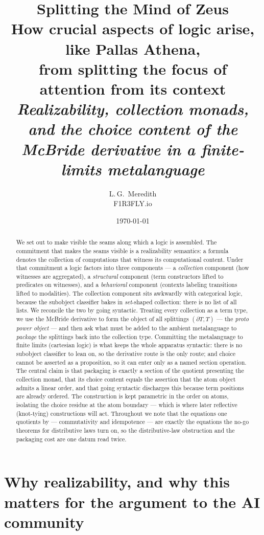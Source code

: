\documentclass[11pt]{article}
\title{\bfseries Splitting the Mind of Zeus\\[4pt]
\large How crucial aspects of logic arise, like Pallas Athena,\\
from splitting the focus of attention from its context\\[6pt]
\normalsize\normalfont\itshape Realizability, collection monads, and the choice
content of the McBride derivative in a finite-limits metalanguage}
\author{L.\,G.\ Meredith\\\small F1R3FLY.io}
\date{\today}
\theoremstyle{definition}
\theoremstyle{plain}
\newcommand{\p}{\partial}
\newcommand{\T}{T}
\begin{document}
\maketitle

\begin{abstract}
\noindent
We set out to make visible the seams along which a logic is assembled. The
commitment that makes the seams visible is a realizability semantics:
a formula denotes the collection of computations that witness its
computational content. Under that commitment a logic factors into three
components --- a \emph{collection} component (how witnesses are aggregated),
a \emph{structural} component (term constructors lifted to predicates on
witnesses), and a \emph{behavioral} component (contexts labeling
transitions lifted to modalities). The collection component sits awkwardly
with categorical logic, because the subobject classifier bakes in
\emph{set}-shaped collection: there is no list of all lists. We reconcile the
two by going syntactic. Treating every collection as a term type, we use the
McBride derivative to form the object of all splittings $(\p\T,\T)$ --- the
\emph{proto power object} --- and then ask what must be added to the ambient
metalanguage to \emph{package} the splittings back into the collection type.
Committing the metalanguage to finite limits (cartesian logic) is what keeps
the whole apparatus syntactic: there is no subobject classifier to lean on,
so the derivative route is the only route; and choice cannot be asserted as a
proposition, so it can enter only as a named section operation. The central
claim is that packaging is exactly a section of the quotient presenting the
collection monad, that its choice content equals the assertion that the atom
object admits a linear order, and that going syntactic discharges this because
term positions are already ordered. The construction is kept parametric in the
order on atoms, isolating the choice residue at the atom boundary --- which is
where later reflective (knot-tying) constructions will act. Throughout we note
that the equations one quotients by --- commutativity and idempotence --- are
exactly the equations the no-go theorems for distributive laws turn on, so the
distributive-law obstruction and the packaging cost are one datum read twice.
\end{abstract}

\tableofcontents

\section{Why realizability, and why this matters for the argument to the
AI community}
\label{sec:motivation}
\end{document}
